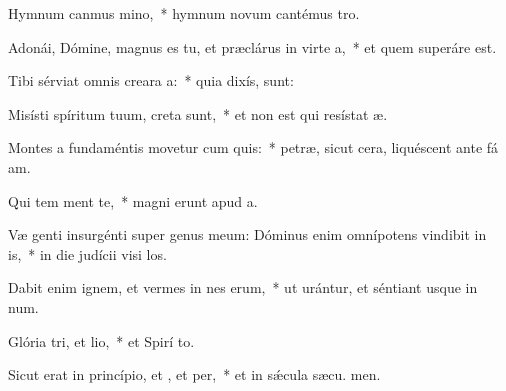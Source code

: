 \item Hymnum canmus mino,~* hymnum novum cantémus  tro.
\item Adonái, Dómine, magnus es tu, et præclárus in virte a,~* et quem superáre  est.
\item Tibi sérviat omnis creara a:~* quia dixís,   sunt:
\item Misísti spíritum tuum,  creta sunt,~* et non est qui resístat  æ.
\item Montes a fundaméntis movetur cum quis:~* petræ, sicut cera, liquéscent ante fá am.
\item Qui tem ment te,~* magni erunt apud   a.
\item Væ genti insurgénti super genus meum: Dóminus enim omnípotens vindibit in is,~* in die judícii visi los.
\item Dabit enim ignem, et vermes in nes erum,~* ut urántur, et séntiant usque in num.
\item Glória tri, et lio,~* et Spirí to.
\item Sicut erat in princípio, et , et per,~* et in sǽcula sæcu. men.
